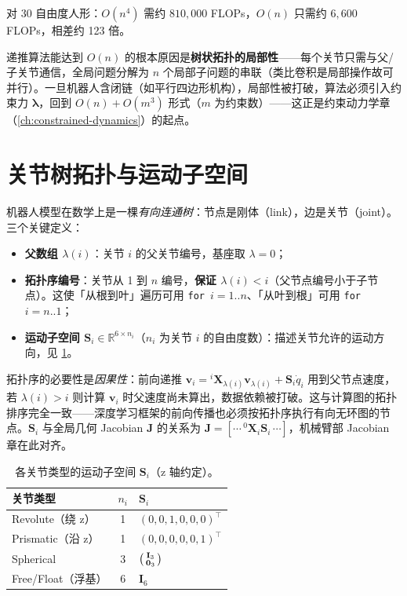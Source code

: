 对 30 自由度人形：$O(n^4)$ 需约 $810{,}000$ FLOPs，$O(n)$ 只需约 $6{,}600$ FLOPs，相差约 123 倍。

\begin{insight}
递推算法能达到 $O(n)$ 的根本原因是\textbf{树状拓扑的局部性}——每个关节只需与父/子关节通信，全局问题分解为 $n$ 个局部子问题的串联（类比卷积是局部操作故可并行）。一旦机器人含闭链（如平行四边形机构），局部性被打破，算法必须引入约束力 $\boldsymbol\lambda$，回到 $O(n)+O(m^3)$ 形式（$m$ 为约束数）——这正是约束动力学章（\cref{ch:constrained-dynamics}）的起点。
\end{insight}

\section{关节树拓扑与运动子空间}
\label{sec:on-tree}

机器人模型在数学上是一棵\emph{有向连通树}：节点是刚体（link），边是关节（joint）。三个关键定义：

\begin{itemize}
  \item \textbf{父数组 $\lambda(i)$}：关节 $i$ 的父关节编号，基座取 $\lambda=0$；
  \item \textbf{拓扑序编号}：关节从 1 到 $n$ 编号，\textbf{保证 $\lambda(i)<i$}（父节点编号小于子节点）。这使「从根到叶」遍历可用 \texttt{for $i=1..\allowbreak n$}、「从叶到根」可用 \texttt{for $i=n..1$}；
  \item \textbf{运动子空间 $\mathbf S_i\in\mathbb R^{6\times n_i}$}（$n_i$ 为关节 $i$ 的自由度数）：描述关节允许的运动方向，见 \cref{tab:on-S}。
\end{itemize}

拓扑序的必要性是\emph{因果性}：前向递推 $\mathbf v_i={}^i\mathbf X_{\lambda(i)}\mathbf v_{\lambda(i)}+\mathbf S_i\dot q_i$ 用到父节点速度，若 $\lambda(i)>i$ 则计算 $\mathbf v_i$ 时父速度尚未算出，数据依赖被打破。这与计算图的拓扑排序完全一致——深度学习框架的前向传播也必须按拓扑序执行有向无环图的节点。$\mathbf S_i$ 与全局几何 Jacobian $\mathbf J$ 的关系为 $\mathbf J=[\cdots\,{}^0\mathbf X_i\mathbf S_i\,\cdots]$，机械臂部 Jacobian 章在此对齐。

\begin{table}[H]\centering\small
\caption{各关节类型的运动子空间 $\mathbf S_i$（z 轴约定）。}
\label{tab:on-S}
\begin{tabular}{lcl}
\toprule
关节类型 & $n_i$ & $\mathbf S_i$ \\
\midrule
Revolute（绕 z） & 1 & $(0,0,1,0,0,0)^\top$ \\
Prismatic（沿 z） & 1 & $(0,0,0,0,0,1)^\top$ \\
Spherical & 3 & $\begin{psmallmatrix}\mathbf I_3\\ \mathbf 0_3\end{psmallmatrix}$ \\
Free/Float（浮基） & 6 & $\mathbf I_6$ \\
\bottomrule
\end{tabular}
\end{table}

